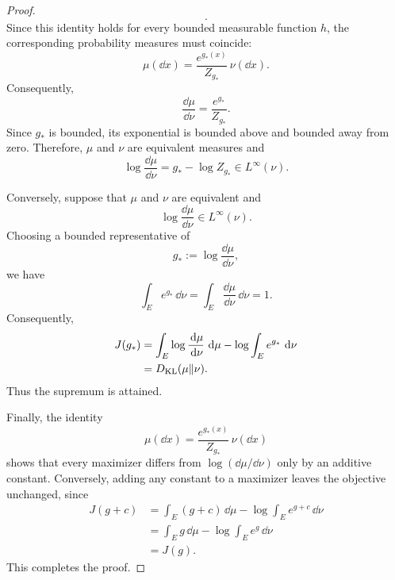 \documentclass[12pt,a4paper,oneside]{book}
\begin{document}
\begin{proof}
\begin{equation*}
{    }.
\end{equation*}
Since this identity holds for every bounded measurable function $h$, the corresponding probability measures must coincide:
\begin{equation*}
    \mu(\dd x) = \frac{e^{g_*(x)}}{Z_{g_*}}\,\nu(\dd x).
\end{equation*}
Consequently,
\begin{equation*}
    \frac{\dd\mu}{\dd\nu} = \frac{e^{g_*}}{Z_{g_*}}.
\end{equation*}
Since $g_*$ is bounded, its exponential is bounded above and bounded away from zero. Therefore, $\mu$ and $\nu$ are
equivalent measures and
\begin{equation*}
    \log\frac{\dd\mu}{\dd\nu} = g_*-\log Z_{g_*} \in L^\infty(\nu).
\end{equation*}

Conversely, suppose that $\mu$ and $\nu$ are equivalent and
\begin{equation*}
    \log\frac{\dd\mu}{\dd\nu}\in L^\infty(\nu).
\end{equation*}
Choosing a bounded representative of
\begin{equation*}
    g_*:=\log\frac{\dd\mu}{\dd\nu},
\end{equation*}
we have
\begin{equation*}
    \int_E e^{g_*}\,\dd\nu = \int_E\frac{\dd\mu}{\dd\nu}\,\dd\nu = 1.
\end{equation*}
Consequently,
\begin{equation*}
    \begin{aligned}
    J(g_*) &= \int_E\log\frac{\,\mathrm{d}\mu}{\,\mathrm{d}\nu}\,\,\mathrm{d}\mu - \log\int_E e^{g_*}\,\,\mathrm{d}\nu\\
    &= D_{\mathrm{KL}}(\mu\Vert\nu).
    \end{aligned}
\end{equation*}
Thus the supremum is attained.

Finally, the identity
\begin{equation*}
    \mu(\dd x)
    =
    \frac{e^{g_*(x)}}{Z_{g_*}}\,\nu(\dd x)
\end{equation*}
shows that every maximizer differs from $\log(\dd\mu/\dd\nu)$ only by an additive constant. Conversely, adding any constant
to a maximizer leaves the objective unchanged, since
\begin{equation*}
    \begin{aligned}
        J(g+c) &= \int_E(g+c)\,\dd\mu - \log\int_E e^{g+c}\,\dd\nu\\
        &= \int_E g\,\dd\mu - \log\int_E e^g\,\dd\nu\\
        &=J(g).
    \end{aligned}
\end{equation*}
This completes the proof.
\end{proof}
\end{document}
